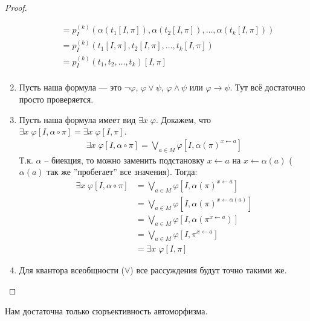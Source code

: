 \begin{proof}
\begin{enumerate}
\begin{align*}
            &= p^{(k)}_I(\alpha(t_1[I, \pi]), \alpha(t_2[I, \pi]), \dots, \alpha(t_k[I, \pi])) \\
            &= p^{(k)}_I(t_1[I, \pi], t_2[I, \pi], \dots, t_k[I, \pi]) \\
            &= p^{(k)}_I(t_1, t_2, \dots, t_k)[I, \pi] \\
        \end{align*}
        \item Пусть наша формула --- это $\lnot \varphi$, $\varphi \vee \psi$, $\varphi \wedge \psi$ или $\varphi \to \psi$. Тут всё достаточно просто проверяется.
        \item Пусть наша формула имеет вид $\exists x \; \varphi$. Докажем, что $\exists x \; \varphi[I, \alpha \circ \pi] = \exists x \; \varphi[I, \pi]$.
        \begin{align*}
            \exists x \; \varphi[I, \alpha \circ \pi] = \bigvee_{a \in M} \varphi[I, \alpha(\pi)^{x \leftarrow a}]
        \end{align*}
        Т.к. $\alpha$ -- биекция, то можно заменить подстановку $x \leftarrow a$ на $x \leftarrow \alpha(a)$ ($\alpha(a)$ так же ''пробегает'' все значения). Тогда:
        \begin{align*}
            \exists x \; \varphi[I, \alpha \circ \pi] &= \bigvee_{a \in M} \varphi[I, \alpha(\pi)^{x \leftarrow a}] \\
            &= \bigvee_{a \in M} \varphi[I, \alpha(\pi)^{x \leftarrow \alpha(a)}] \\
            &= \bigvee_{a \in M} \varphi[I, \alpha(\pi^{x \leftarrow a})] \\
            &= \bigvee_{a \in M} \varphi[I, \pi^{x \leftarrow a}] \\
            &= \exists x \; \varphi[I, \pi]
        \end{align*}
        \item Для квантора всеобщности ($\forall$) все рассуждения будут точно такими же.
    \end{enumerate}
\end{proof}
\notice Нам достаточна только сюръективность автоморфизма.

